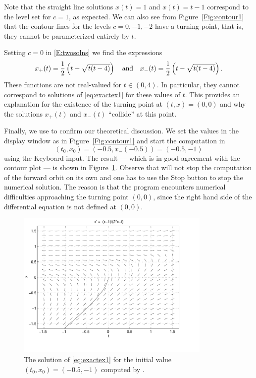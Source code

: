 \documentclass{ximera}
\begin{document}
Note that the straight line solutions $x(t)=1$ and $x(t)=t-1$ 
correspond to the level set for $c=1$, as expected.  We can also
see from Figure~\ref{Fig:contour1} that the contour lines for
the levels $c=0,-1,-2$ have a turning point, that is, they
cannot be parameterized entirely by $t$.  

Setting $c=0$ in \eqref{E:twosolns} we find the expressions
\[
x_+(t) = \frac{1}{2}\left(t+\sqrt{t(t-4)}\right) \quad\mbox{and}\quad
x_-(t) = \frac{1}{2}\left(t-\sqrt{t(t-4)}\right).
\]
These functions are not real-valued for $t\in (0,4)$.  In
particular, they cannot correspond to solutions of
\eqref{eq:exactex1} for these values of $t$.  This provides
an explanation for the existence of the turning point at
$(t,x)=(0,0)$ and why the solutions $x_+(t)$ and $x_-(t)$
``collide'' at this point.

Finally, we use {\dfield} to confirm our 
theoretical discussion.  We set the values in {\sf the display window}
as in Figure~\ref{Fig:contour1} and start the computation in 
\[
(t_0,x_0)=(-0.5,x_-(-0.5))=(-0.5,-1)
\]
using the {\sf Keyboard input}.  The result --- which is in good
agreement with the contour plot --- is shown in
Figure~\ref{Fig:contour2}.  Observe that {\dfield} will not 
stop the computation of the forward orbit on its own and one has to
use the {\sf Stop} button to stop the numerical solution.  The reason is
that the program encounters numerical difficulties approaching the turning
point $(0,0)$, since the right hand side of the differential equation is
not defined at $(0,0)$.

\begin{figure}[htb]
  \centerline{%
  \includegraphics[width=3.7in]{../figures/contour2.pdf}}
  \caption{The solution of \protect\eqref{eq:exactex1} for the
  initial value $(t_0,x_0)=(-0.5,-1)$ computed by {\dfield}.}
  \label{Fig:contour2}
\end{figure}
\end{document}
